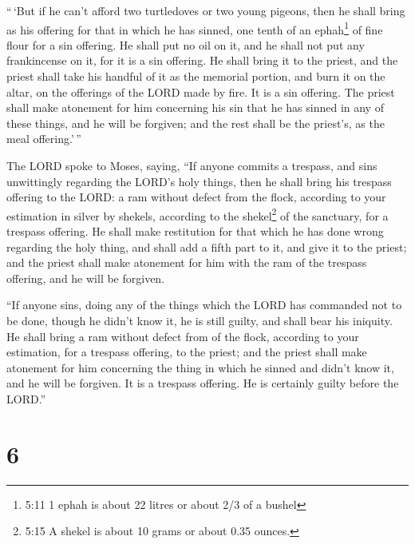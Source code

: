  ``\,`But if he can't afford two turtledoves or two young
pigeons, then he shall bring as his offering for that in which he has
sinned, one tenth of an ephah\footnote{5:11 1 ephah is about 22 litres
  or about 2/3 of a bushel} of fine flour for a sin offering. He shall
put no oil on it, and he shall not put any frankincense on it, for it is
a sin offering.  He shall bring it to the priest, and the
priest shall take his handful of it as the memorial portion, and burn it
on the altar, on the offerings of the LORD made by fire. It is a sin
offering.  The priest shall make atonement for him
concerning his sin that he has sinned in any of these things, and he
will be forgiven; and the rest shall be the priest's, as the meal
offering.'\,''

 The LORD spoke to Moses, saying,  ``If anyone
commits a trespass, and sins unwittingly regarding the LORD's holy
things, then he shall bring his trespass offering to the LORD: a ram
without defect from the flock, according to your estimation in silver by
shekels, according to the shekel\footnote{5:15 A shekel is about 10
  grams or about 0.35 ounces.} of the sanctuary, for a trespass
offering.  He shall make restitution for that which he has
done wrong regarding the holy thing, and shall add a fifth part to it,
and give it to the priest; and the priest shall make atonement for him
with the ram of the trespass offering, and he will be forgiven.

 ``If anyone sins, doing any of the things which the LORD
has commanded not to be done, though he didn't know it, he is still
guilty, and shall bear his iniquity.  He shall bring a ram
without defect from of the flock, according to your estimation, for a
trespass offering, to the priest; and the priest shall make atonement
for him concerning the thing in which he sinned and didn't know it, and
he will be forgiven.  It is a trespass offering. He is
certainly guilty before the LORD.''

\hypertarget{section-5}{%
\section{6}\label{section-5}}

